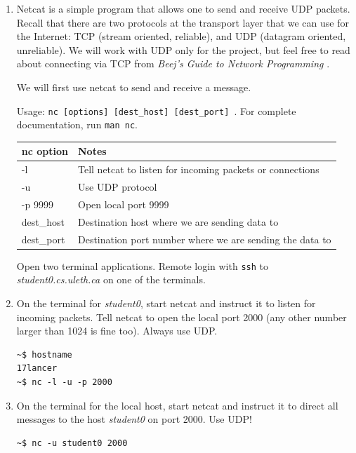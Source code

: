 \documentclass[12pt]{book}
\begin{document}
\begin{enumerate}[label=Activity \arabic*:]
\item Netcat is a simple program that allows one to send and receive UDP packets. Recall that there are two protocols at the transport layer that we can use for the Internet: TCP (stream oriented, reliable), and UDP (datagram oriented, unreliable). We will work with UDP only for the project, but feel free to read about connecting via TCP from \emph{Beej's Guide to Network Programming} \cite{hall2009beej}.

  We will first use netcat to send and receive a message.

  Usage: \verb$nc [options] [dest_host] [dest_port] $. For complete documentation, run \verb$man nc$.

  \begin{tabular}{l p{11cm}}
    \toprule
    nc option & Notes \\
    \midrule
    -l & Tell netcat to listen for incoming packets or connections \\
    -u & Use UDP protocol \\
    -p 9999 & Open local port 9999 \\
    dest\_host & Destination host where we are sending data to \\
    dest\_port & Destination port number where we are sending the data to \\
    \bottomrule
  \end{tabular}

  Open two terminal applications. Remote login with \verb$ssh$ to \emph{student0.cs.uleth.ca} on one of the terminals.

\item On the terminal for \emph{student0}, start netcat and instruct it to listen for incoming packets. Tell netcat to open the local port 2000 (any other number larger than 1024 is fine too). Always use UDP.

  \begin{lstlisting}
~$ hostname
17lancer
~$ nc -l -u -p 2000   
  \end{lstlisting}

\item On the terminal for the local host, start netcat and instruct it to direct all messages to the host \emph{student0} on port 2000. Use UDP!

  \begin{lstlisting}
~$ nc -u student0 2000
  \end{lstlisting}


\end{enumerate}
\end{document}

